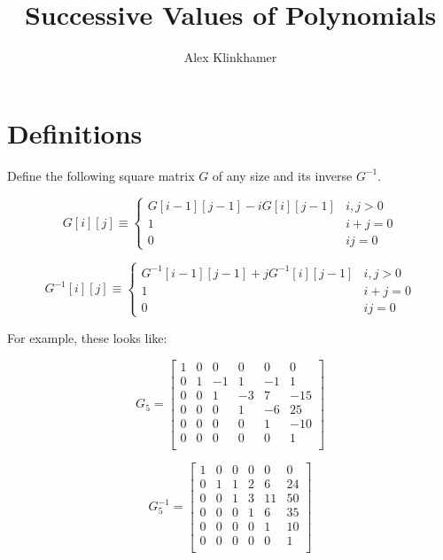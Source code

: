 



\title{Successive Values of Polynomials}
\author{Alex Klinkhamer}
\maketitle

\section{Definitions}

Define the following square matrix $G$ of any size and its inverse $G^{-1}$.

\begin{equation}
 \label{eq:def_G}
 G[i][j] \equiv
 \begin{cases}
  G[i-1][j-1] - i G[i][j-1] & i,j > 0 \\
  1 & i + j = 0 \\
  0 & i j = 0
 \end{cases}
\end{equation}

\begin{equation}
 \label{eq:def_G_inv}
 G^{-1}[i][j] \equiv
 \begin{cases}
  G^{-1}[i-1][j-1] + j G^{-1}[i][j-1] & i,j > 0 \\
  1 & i + j = 0 \\
  0 & i j = 0
 \end{cases}
\end{equation}

For example, these looks like:

\[
 G_5 = 
\left[
\begin{array}{rrrrrr}
 1 & 0 &  0 &  0 &  0 &   0 \\
 0 & 1 & -1 &  1 & -1 &   1 \\
 0 & 0 &  1 & -3 &  7 & -15 \\
 0 & 0 &  0 &  1 & -6 &  25 \\
 0 & 0 &  0 &  0 &  1 & -10 \\
 0 & 0 &  0 &  0 &  0 &   1 \\
\end{array}
\right]
\]

\[
 G_5^{-1} = 
\left[
\begin{array}{rrrrrr}
 1 & 0 &  0 &  0 &  0 &  0 \\
 0 & 1 &  1 &  2 &  6 & 24 \\
 0 & 0 &  1 &  3 & 11 & 50 \\
 0 & 0 &  0 &  1 &  6 & 35 \\
 0 & 0 &  0 &  0 &  1 & 10 \\
 0 & 0 &  0 &  0 &  0 &  1 \\
\end{array}
\right]
\]

